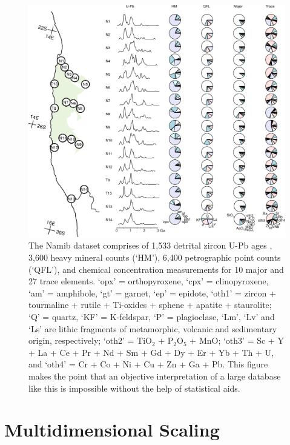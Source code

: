 \documentclass{article}
\begin{document}
\begin{figure}[!ht]
\includegraphics[width=\textwidth]{NamData.png}
\caption{The Namib dataset comprises of 1,533 detrital zircon U-Pb
  ages \citep[shown as kernel density estimates with a bandwidth of 30
    Ma,][]{vermeesch2012b}, 3,600 heavy mineral counts (`HM'), 6,400
  petrographic point counts (`QFL'), and chemical concentration
  measurements for 10 major and 27 trace elements.  `opx' =
  orthopyroxene, `cpx' = clinopyroxene, `am' = amphibole, `gt' =
  garnet, `ep' = epidote, `oth1' = zircon + tourmaline + rutile +
  Ti-oxides + sphene + apatite + staurolite; `Q' = quartz, `KF' =
  K-feldspar, `P' = plagioclase, `Lm', `Lv' and `Ls' are lithic
  fragments of metamorphic, volcanic and sedimentary origin,
  respectively; `oth2' = TiO$_2$ + P$_2$O$_5$ + MnO; `oth3' = Sc + Y +
  La + Ce + Pr + Nd + Sm + Gd + Dy + Er + Yb + Th + U, and `oth4' = Cr
  + Co + Ni + Cu + Zn + Ga + Pb. This figure makes the point that an
  objective interpretation of a large database like this is impossible
  without the help of statistical aids.}
\label{fig:data}
\end{figure}

\section{Multidimensional Scaling}
\label{sec:MDS}
\end{document}
